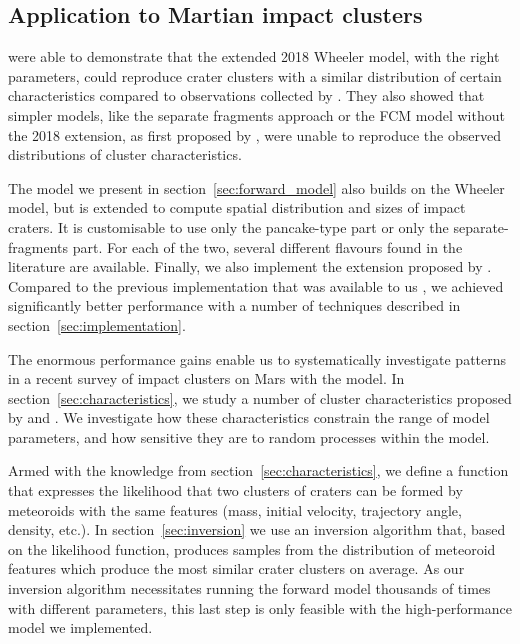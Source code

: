\subsection{Application to Martian impact clusters}

\cite{newland2019CFM18} were able to demonstrate that the extended 2018 Wheeler model, with the right parameters, could reproduce crater clusters with a similar distribution of certain characteristics compared to observations collected by \cite{daubar2019recently}.
They also showed that simpler models, like the separate fragments approach or the FCM model without the 2018 extension, as first proposed by \cite{wheeler2017fragmentcloud}, were unable to reproduce the observed distributions of cluster characteristics.

The model we present in section~\ref{sec:forward_model} also builds on the Wheeler model, but is extended to compute spatial distribution and sizes of impact craters. It is customisable to use only the pancake-type part or only the separate-fragments part. For each of the two, several different flavours found in the literature are available. Finally, we also implement the extension proposed by \cite{wheeler2018atmospheric}.
Compared to the previous implementation that was available to us \citep{newland2019CFM18}, we achieved significantly better performance with a number of techniques described in section~\ref{sec:implementation}.

The enormous performance gains enable us to systematically investigate patterns in a recent survey of impact clusters on Mars \citep{daubar2019recently} with the model. In section~\ref{sec:characteristics}, we study a number of cluster characteristics proposed by \cite{daubar2019recently} and \cite{newland2019CFM18}.
We investigate how these characteristics constrain the range of model parameters, and how sensitive they are to random processes within the model.

Armed with the knowledge from section~\ref{sec:characteristics}, we define a function that expresses the likelihood that two clusters of craters can be formed by meteoroids with the same features (mass, initial velocity, trajectory angle, density, etc.). In section~\ref{sec:inversion} we use an inversion algorithm that, based on the likelihood function, produces samples from the distribution of meteoroid features which produce the most similar crater clusters on average. As our inversion algorithm necessitates running the forward model thousands of times with different parameters, this last step is only feasible with the high-performance model we implemented.
